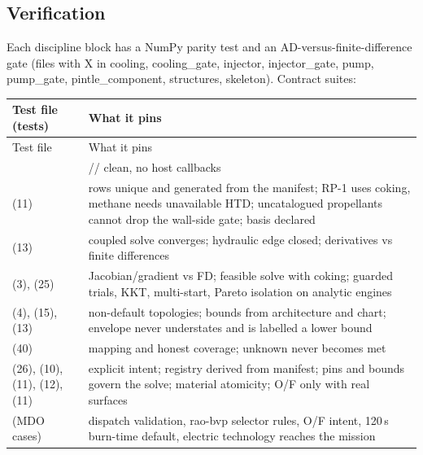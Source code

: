 \subsection{Verification}\label{sec:s13-tests}
Each discipline block has a NumPy parity test and an AD-versus-finite-difference gate (files  with X in cooling, cooling\_gate, injector, injector\_gate, pump, pump\_gate, pintle\_component, structures, skeleton). Contract suites:

{\footnotesize
\begin{longtable}{@{}P{6.4cm}P{9.4cm}@{}}
\toprule
Test file (tests) & What it pins\\
\midrule\endfirsthead
\toprule Test file & What it pins\\ \midrule\endhead
{} & // clean, no host callbacks\\
 (11) & rows unique and generated from the manifest; RP-1 uses coking, methane needs unavailable HTD; uncatalogued propellants cannot drop the wall-side gate; basis declared\\
 (13) & coupled solve converges; hydraulic edge closed; derivatives vs finite differences\\
 (3),  (25) & Jacobian/gradient vs FD; feasible solve with coking; guarded trials, KKT, multi-start, Pareto isolation on analytic engines\\
 (4),  (15),  (13) & non-default topologies; bounds from architecture and chart; envelope never understates and is labelled a lower bound\\
 (40) & mapping and honest coverage; unknown never becomes met\\
 (26),  (10),  (11),  (12),  (11) & explicit intent; registry derived from manifest; pins and bounds govern the solve; material atomicity; O/F only with real surfaces\\
 (MDO cases) & dispatch validation, rao-bvp selector rules, O/F intent, 120\,s burn-time default, electric technology reaches the mission\\
\bottomrule
\end{longtable}
}

